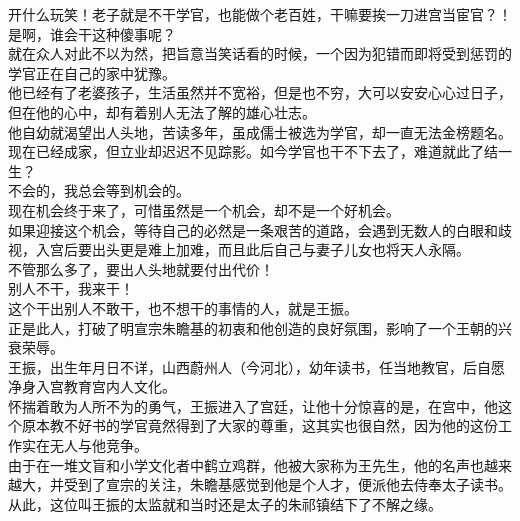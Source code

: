 \begin{multicols}{\theparacolNo}
开什么玩笑！老子就是不干学官，也能做个老百姓，干嘛要挨一刀进宫当宦官？！\\

是啊，谁会干这种傻事呢？\\

就在众人对此不以为然，把旨意当笑话看的时候，一个因为犯错而即将受到惩罚的学官正在自己的家中犹豫。\\

他已经有了老婆孩子，生活虽然并不宽裕，但是也不穷，大可以安安心心过日子，但在他的心中，却有着别人无法了解的雄心壮志。\\

他自幼就渴望出人头地，苦读多年，虽成儒士被选为学官，却一直无法金榜题名。现在已经成家，但立业却迟迟不见踪影。如今学官也干不下去了，难道就此了结一生？\\

不会的，我总会等到机会的。\\

现在机会终于来了，可惜虽然是一个机会，却不是一个好机会。\\

如果迎接这个机会，等待自己的必然是一条艰苦的道路，会遇到无数人的白眼和歧视，入宫后要出头更是难上加难，而且此后自己与妻子儿女也将天人永隔。\\

不管那么多了，要出人头地就要付出代价！\\

别人不干，我来干！\\

这个干出别人不敢干，也不想干的事情的人，就是王振。\\

正是此人，打破了明宣宗朱瞻基的初衷和他创造的良好氛围，影响了一个王朝的兴衰荣辱。\\

王振，出生年月日不详，山西蔚州人（今河北），幼年读书，任当地教官，后自愿净身入宫教育宫内人文化。\\

怀揣着敢为人所不为的勇气，王振进入了宫廷，让他十分惊喜的是，在宫中，他这个原本教不好书的学官竟然得到了大家的尊重，这其实也很自然，因为他的这份工作实在无人与他竞争。\\

由于在一堆文盲和小学文化者中鹤立鸡群，他被大家称为王先生，他的名声也越来越大，并受到了宣宗的关注，朱瞻基感觉到他是个人才，便派他去侍奉太子读书。\\

从此，这位叫王振的太监就和当时还是太子的朱祁镇结下了不解之缘。\\


\end{multicols}
